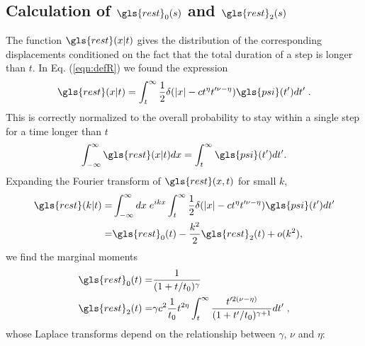 \subsection*{Calculation of  $\gls{rest}_0(s)$ and $\gls{rest}_2(s)$}
The function $\gls{rest}(x|t)$ gives the distribution of
the corresponding displacements conditioned on the fact that the total duration of a step is longer than $t$. In Eq. (\ref{eqn:defR}) we found the expression
%
\begin{equation}
 \gls{rest}(x|t) =  \int_t^\infty \frac{1}{2} \delta(|x| - c t^{\eta}t'^{\nu-\eta}) \gls{psi}(t') dt' \; .
\end{equation}
This is correctly normalized to the overall probability to stay within a single step for a time longer than $t$ 
\begin{equation}
 \int_{-\infty}^{\infty} \gls{rest}(x|t)  dx = \int_t^\infty \gls{psi}(t') dt'.
\end{equation}
Expanding the Fourier transform of $\gls{rest}(x,t)$ for small $k$,
\begin{align}
\gls{rest}(k|t) =& \int_{-\infty}^{\infty} dx \; e^{ikx} \int_t^\infty \frac{1}{2} \delta(|x| - c t^{\eta}t'^{\nu-\eta}) \gls{psi}(t') dt' \nonumber \\
=& \gls{rest}_0(t) - \frac{k^2}{2} \gls{rest}_2(t) + o(k^2), 
\end{align}
we find the marginal moments
\begin{align}
\gls{rest}_0(t) =& \frac{1}{(1+t/t_0)^{\gamma}} \\
\gls{rest}_2(t) =& \gamma c^2 \frac{1 }{t_0} t^{2\eta} \int_t^\infty \frac{t'^{2(\nu-\eta)}}{(1+t'/t_0)^{\gamma+1}} dt' \; , 
\end{align}
whose Laplace transforms depend on the relationship between $\gamma$, $\nu$ and $\eta$: 

